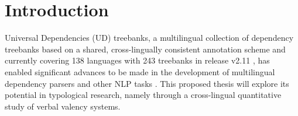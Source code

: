 \section{Introduction}


Universal Dependencies (UD) treebanks, a multilingual collection of dependency treebanks based on a shared, cross-lingually consistent annotation scheme \citet{nivre2020} and currently covering 138 languages with 243 treebanks in release v2.11 \cite{universaldep}, has enabled significant advances to be made in the development of multilingual dependency parsers and other NLP tasks \citep{zeman2017, zeman2018}. This proposed thesis will explore its potential in typological research, namely through a cross-lingual quantitative study of verbal valency systems. 